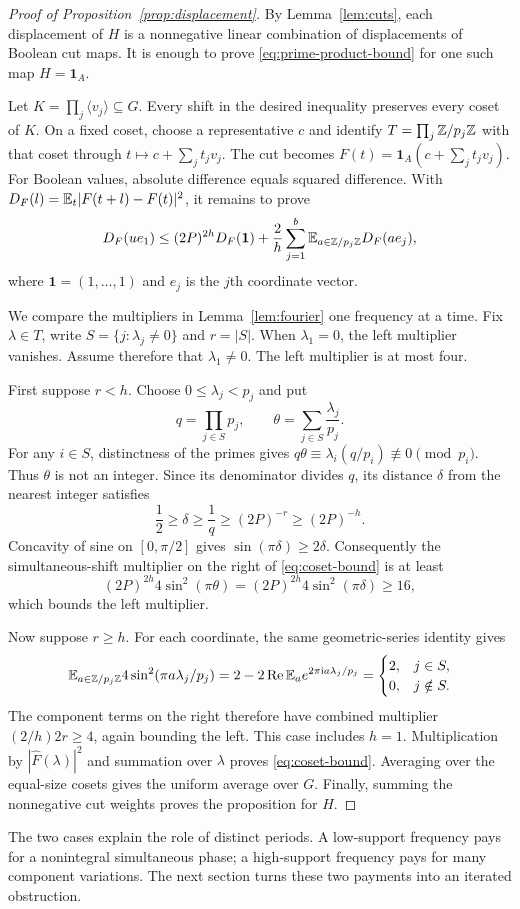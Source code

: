 \begin{proof}[Proof of Proposition~\ref{prop:displacement}]
By Lemma~\ref{lem:cuts}, each displacement of $H$ is a nonnegative
linear combination of displacements of Boolean cut maps. It is enough
to prove \eqref{eq:prime-product-bound} for one such map
$H=\mathbf1_A$.

Let $K=\prod_j\langle v_j\rangle\subseteq G$. Every shift in the desired
inequality preserves every coset of $K$. On a fixed coset, choose a
representative $c$ and identify
$T=\prod_j\mathbb Z/p_j\mathbb Z$ with that coset through
$t\mapsto c+\sum_jt_jv_j$. The cut becomes
$F(t)=\mathbf1_A(c+\sum_jt_jv_j)$. For Boolean values, absolute
difference equals squared difference. With
$D_F(l)=\mathbb E_t|F(t+l)-F(t)|^2$, it remains to prove
\begin{equation}\label{eq:coset-bound}
 D_F(ue_1)\le(2P)^{2h}D_F(\mathbf1)
 +\frac2h\sum_{j=1}^b\mathbb E_{a\in\mathbb Z/p_j\mathbb Z}D_F(ae_j),
\end{equation}
where $\mathbf1=(1,\ldots,1)$ and $e_j$ is the $j$th coordinate vector.

We compare the multipliers in Lemma~\ref{lem:fourier} one frequency at
a time. Fix $\lambda\in T$, write
$S=\{j:\lambda_j\ne0\}$ and $r=|S|$. When $\lambda_1=0$, the
left multiplier vanishes. Assume therefore that $\lambda_1\ne0$.
The left multiplier is at most four.

First suppose $r<h$. Choose $0\le\lambda_j<p_j$ and put
\[
 q=\prod_{j\in S}p_j,\qquad
 \theta=\sum_{j\in S}\frac{\lambda_j}{p_j}.
\]
For any $i\in S$, distinctness of the primes gives
$q\theta\equiv\lambda_i(q/p_i)\not\equiv0\pmod{p_i}$.
Thus $\theta$ is not an integer. Since its denominator divides $q$,
its distance $\delta$ from the nearest integer satisfies
\[
 \frac12\ge\delta\ge\frac1q
 \ge(2P)^{-r}\ge(2P)^{-h}.
\]
Concavity of sine on $[0,\pi/2]$ gives
$\sin(\pi\delta)\ge2\delta$. Consequently the simultaneous-shift
multiplier on the right of \eqref{eq:coset-bound} is at least
\[
 (2P)^{2h}4\sin^2(\pi\theta)
 =(2P)^{2h}4\sin^2(\pi\delta)\ge16,
\]
which bounds the left multiplier.

Now suppose $r\ge h$. For each coordinate, the same geometric-series
identity gives
\[
 \mathbb E_{a\in\mathbb Z/p_j\mathbb Z}4\sin^2(\pi a\lambda_j/p_j)
 =2-2\operatorname{Re}\mathbb E_a e^{2\pi\mathrm ia\lambda_j/p_j}
 =\begin{cases}2,&j\in S,\\0,&j\notin S.\end{cases}
\]
The component terms on the right therefore have combined multiplier
$(2/h)2r\ge4$, again bounding the left. This case includes $h=1$.
Multiplication by $|\widehat F(\lambda)|^2$ and summation over
$\lambda$ proves \eqref{eq:coset-bound}. Averaging over the equal-size
cosets gives the uniform average over $G$. Finally, summing the
nonnegative cut weights proves the proposition for $H$.
\end{proof}

The two cases explain the role of distinct periods. A low-support
frequency pays for a nonintegral simultaneous phase; a high-support
frequency pays for many component variations. The next section turns
these two payments into an iterated obstruction.

